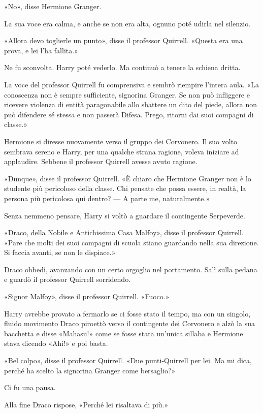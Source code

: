 «No», disse Hermione Granger.

La sua voce era calma, e anche se non era alta, ognuno poté udirla nel silenzio.

«Allora devo toglierle un punto», disse il professor Quirrell. «Questa era una prova, e lei l’ha fallita.»

Ne fu sconvolta. Harry poté vederlo. Ma continuò a tenere la schiena dritta.

La voce del professor Quirrell fu comprensiva e sembrò riempire l’intera aula. «La conoscenza non è sempre sufficiente, signorina Granger. Se non può infliggere e ricevere violenza di entità paragonabile allo sbattere un dito del piede, allora non può difendere sé stessa e non passerà Difesa. Prego, ritorni dai suoi compagni di classe.»

Hermione si diresse nuovamente verso il gruppo dei Corvonero. Il suo volto sembrava sereno e Harry, per una qualche strana ragione, voleva iniziare ad applaudire. Sebbene il professor Quirrell avesse avuto ragione.

«Dunque», disse il professor Quirrell. «È chiaro che Hermione Granger non è lo studente più pericoloso della classe. Chi pensate che possa essere, in realtà, la persona più pericolosa qui dentro? — A parte me, naturalmente.»

Senza nemmeno pensare, Harry si voltò a guardare il contingente Serpeverde.

«Draco, della Nobile e Antichissima Casa Malfoy», disse il professor Quirrell. «Pare che molti dei suoi compagni di scuola stiano guardando nella sua direzione. Si faccia avanti, se non le dispiace.»

Draco obbedì, avanzando con un certo orgoglio nel portamento. Salì sulla pedana e guardò il professor Quirrell sorridendo.

«Signor Malfoy», disse il professor Quirrell. «Fuoco.»

Harry avrebbe provato a fermarlo se ci fosse stato il tempo, ma con un singolo, fluido movimento Draco piroettò verso il contingente dei Corvonero e alzò la sua bacchetta e disse «Mahasu!» come se fosse stata un’unica sillaba e Hermione stava dicendo «Ahi!» e poi basta.

«Bel colpo», disse il professor Quirrell. «Due punti-Quirrell per lei. Ma mi dica, perché ha scelto la signorina Granger come bersaglio?»

Ci fu una pausa.

Alla fine Draco rispose, «Perché lei risaltava di più.»

